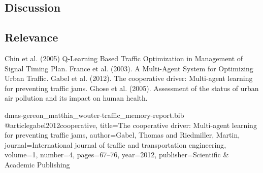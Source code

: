 \documentclass[a4paper,hidelinks]{article}
\begin{document}
\subsection{Discussion}
\subsection{Relevance}





\begin{thebibliography}{8}


 Chin et al. (2005) Q-Learning Based Traffic Optimization in Management of Signal Timing Plan.
 France et al. (2003). A Multi-Agent System for Optimizing Urban Traffic.
 Gabel et al. (2012). The cooperative driver: Multi-agent learning for preventing traffic jams.
 Ghose et al. (2005). Assessment of the status of urban air pollution and its impact on human health.

\end{thebibliography}

\begin{filecontents}{dmas-gereon_matthia_wouter-traffic_memory-report.bib}
@article{gabel2012cooperative,
  title={The cooperative driver: Multi-agent learning for preventing traffic jams},
  author={Gabel, Thomas and Riedmiller, Martin},
  journal={International journal of traffic and transportation engineering},
  volume={1},
  number={4},
  pages={67--76},
  year={2012},
  publisher={Scientific \& Academic Publishing}
}
\end{filecontents}
\end{document}
